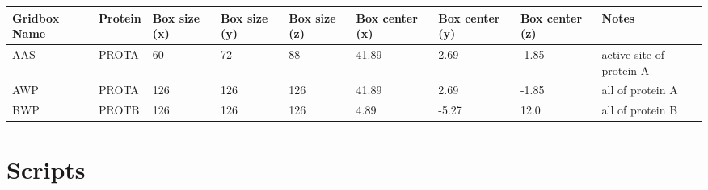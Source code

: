 \begin{table}[h]\scriptsize
	\label{tab:gridboxes.csv}
		\begin{tabular}
		{|p{1.1cm}|l|p{1.1cm}|p{1.1cm}|p{1.1cm}|p{1.3cm}|p{1.3cm}|p{1.3cm}|p{1.6cm}|}
			\hline
			\textbf{Gridbox Name} & \textbf{Protein} & \textbf{Box size (x)} & \textbf{Box size (y)} & \textbf{Box size (z)} & \textbf{Box center (x)} & \textbf{Box center (y)} & \textbf{Box center (z)} & \textbf{Notes} \\
			\hline
			\hline
			AAS & PROTA & 60 & 72 & 88 & 41.89 & 2.69 & -1.85 & active site of protein A \\
			\hline
			AWP & PROTA & 126 & 126 & 126 & 41.89 & 2.69 & -1.85 & all of protein A \\
			\hline
			BWP & PROTB & 126 & 126 & 126 & 4.89 & -5.27 & 12.0 & all of protein B \\
			\hline
		\end{tabular}
\end{table}

\newpage
\section{Scripts}

